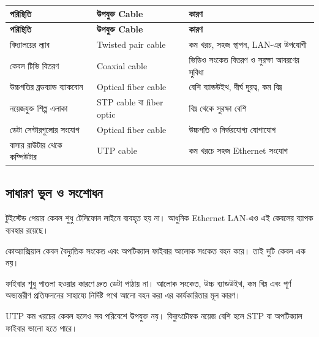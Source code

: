 \begingroup
\begin{longtable}{|p{}|p{}|p{}|}
\hline
\textbf{পরিস্থিতি} & \textbf{উপযুক্ত Cable} & \textbf{কারণ} \\
\hline
\endfirsthead
\hline
\textbf{পরিস্থিতি} & \textbf{উপযুক্ত Cable} & \textbf{কারণ} \\
\hline
\endhead

বিদ্যালয়ের ল্যাব & Twisted pair cable & কম খরচ, সহজ স্থাপন, LAN-এর উপযোগী \\
\hline
কেবল টিভি বিতরণ & Coaxial cable & ভিডিও সংকেত বিতরণ ও সুরক্ষা আবরণের সুবিধা \\
\hline
উচ্চগতির ব্রডব্যান্ড ব্যাকবোন & Optical fiber cable & বেশি ব্যান্ডউইথ, দীর্ঘ দূরত্ব, কম বিঘ্ন \\
\hline
নয়েজযুক্ত শিল্প এলাকা & STP cable বা fiber optic & বিঘ্ন থেকে সুরক্ষা বেশি \\
\hline
ডেটা সেন্টারগুলোর সংযোগ & Optical fiber cable & উচ্চগতি ও নির্ভরযোগ্য যোগাযোগ \\
\hline
বাসার রাউটার থেকে কম্পিউটার & UTP cable & কম খরচে সহজ Ethernet সংযোগ \\
\hline
\end{longtable}
\endgroup




\subsection{সাধারণ ভুল ও সংশোধন}

টুইস্টেড পেয়ার কেবল শুধু টেলিফোন লাইনে ব্যবহৃত হয় না। আধুনিক Ethernet LAN-এও এই কেবলের ব্যাপক ব্যবহার রয়েছে।

কোঅ্যাক্সিয়াল কেবল বৈদ্যুতিক সংকেত এবং অপটিক্যাল ফাইবার আলোক সংকেত বহন করে। তাই দুটি কেবল এক নয়।

ফাইবার শুধু পাতলা হওয়ার কারণে দ্রুত ডেটা পাঠায় না। আলোক সংকেত, উচ্চ ব্যান্ডউইথ, কম বিঘ্ন এবং পূর্ণ অভ্যন্তরীণ প্রতিফলনের সাহায্যে নির্দিষ্ট পথে আলো বহন করা এর কার্যকারিতার মূল কারণ।

UTP কম খরচের কেবল হলেও সব পরিবেশে উপযুক্ত নয়। বিদ্যুৎচৌম্বক নয়েজ বেশি হলে STP বা অপটিক্যাল ফাইবার ভালো হতে পারে।

